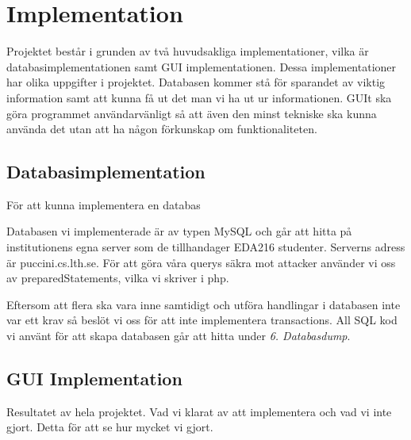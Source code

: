\section{Implementation}

Projektet består i grunden av två huvudsakliga implementationer, vilka är databasimplementationen samt GUI implementationen. Dessa implementationer har olika uppgifter i projektet. Databasen kommer stå för sparandet av viktig information samt att kunna få ut det man vi ha ut ur informationen. GUIt ska göra programmet användarvänligt så att även den minst tekniske ska kunna använda det utan att ha någon förkunskap om funktionaliteten.

\subsection{Databasimplementation}

För att kunna implementera en databas

Databasen vi implementerade är av typen MySQL och går att hitta på institutionens egna server som de tillhandager EDA216 studenter. Serverns adress är puccini.cs.lth.se. För att göra våra querys säkra mot attacker använder vi oss av preparedStatements, vilka vi skriver i php. 

Eftersom att flera ska vara inne samtidigt och utföra handlingar i databasen inte var ett krav så beslöt vi oss för att inte implementera transactions. All SQL kod vi använt för att skapa databasen går att hitta under \emph{6. Databasdump}.

\subsection{GUI Implementation}



Resultatet av hela projektet. Vad vi klarat av att implementera och vad vi inte gjort. Detta för att se hur mycket vi gjort. 